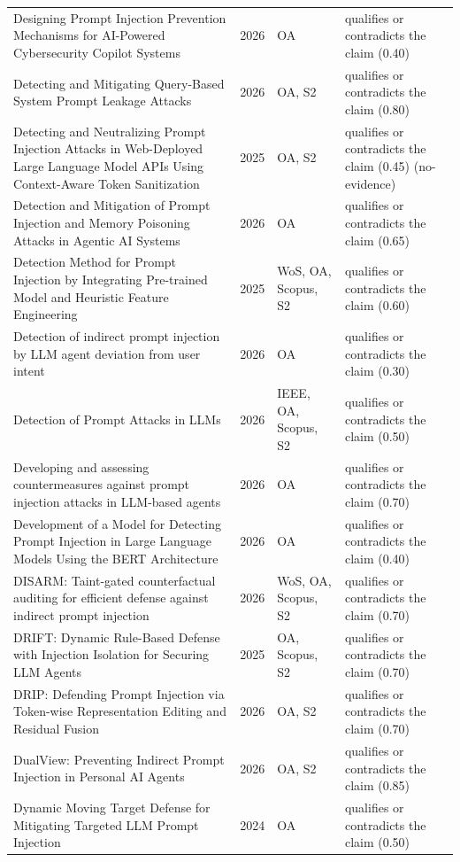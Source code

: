 \begin{longtable}{@{}%
  >{\raggedright\arraybackslash}p{}c%
  >{\raggedright\arraybackslash}p{}%
  >{\raggedright\arraybackslash}p{}@{}}
Designing Prompt Injection Prevention Mechanisms for AI-Powered Cybersecurity Copilot Systems & 2026 & OA & qualifies or contradicts the claim (0.40) \\
Detecting and Mitigating Query-Based System Prompt Leakage Attacks & 2026 & OA, S2 & qualifies or contradicts the claim (0.80) \\
Detecting and Neutralizing Prompt Injection Attacks in Web-Deployed Large Language Model APIs Using Context-Aware Token Sanitization & 2025 & OA, S2 & qualifies or contradicts the claim (0.45) (no-evidence) \\
Detection and Mitigation of Prompt Injection and Memory Poisoning Attacks in Agentic AI Systems & 2026 & OA & qualifies or contradicts the claim (0.65) \\
Detection Method for Prompt Injection by Integrating Pre-trained Model and Heuristic Feature Engineering & 2025 & WoS, OA, Scopus, S2 & qualifies or contradicts the claim (0.60) \\
Detection of indirect prompt injection by LLM agent deviation from user intent & 2026 & OA & qualifies or contradicts the claim (0.30) \\
Detection of Prompt Attacks in LLMs & 2026 & IEEE, OA, Scopus, S2 & qualifies or contradicts the claim (0.50) \\
Developing and assessing countermeasures against prompt injection attacks in LLM-based agents & 2026 & OA & qualifies or contradicts the claim (0.70) \\
Development of a Model for Detecting Prompt Injection in Large Language Models Using the BERT Architecture & 2026 & OA & qualifies or contradicts the claim (0.40) \\
DISARM: Taint-gated counterfactual auditing for efficient defense against indirect prompt injection & 2026 & WoS, OA, Scopus, S2 & qualifies or contradicts the claim (0.70) \\
DRIFT: Dynamic Rule-Based Defense with Injection Isolation for Securing LLM Agents & 2025 & OA, Scopus, S2 & qualifies or contradicts the claim (0.70) \\
DRIP: Defending Prompt Injection via Token-wise Representation Editing and Residual Fusion & 2026 & OA, S2 & qualifies or contradicts the claim (0.70) \\
DualView: Preventing Indirect Prompt Injection in Personal AI Agents & 2026 & OA, S2 & qualifies or contradicts the claim (0.85) \\
Dynamic Moving Target Defense for Mitigating Targeted LLM Prompt Injection & 2024 & OA & qualifies or contradicts the claim (0.50) \\

\end{longtable}
